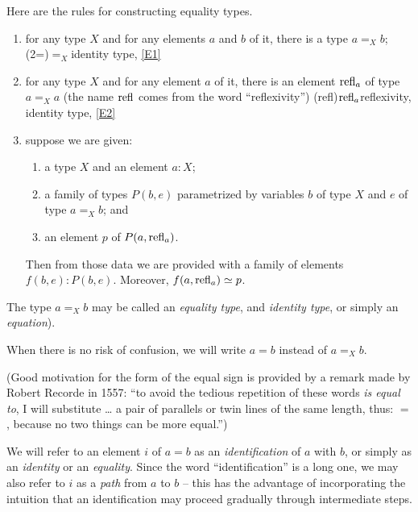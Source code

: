 Here are the rules for constructing equality types.
\begin{enumerate}[label=(E\arabic*),ref=(E\arabic*)]\label{rules-for-equality}
\item\label{E1}
  for any type $X$ and for any elements $a$ and $b$ of it, there is a type $a =_X b$;%
  \glossary(2=){${=_X}$}{identity type, \cref{E1}}%
\item\label{E2} for any type $X$ and for any element $a$ of it, there is an element $\mathrm{refl}_{a}$ of type $a =_X a$
  (the name $\mathrm{refl}_{}$ comes from the word ``reflexivity'')%
  \glossary(refl){$\protect\mathrm{refl}_{a}$}{reflexivity, identity type, \cref{E2}}
\item\label{E3} suppose we are given:
  \begin{enumerate}
  \item a type $X$ and an element $a:X$;
  \item a family of types $P(b,e)$ parametrized by variables $b$ of type $X$ and $e$ of type $a =_X b$; and
  \item an element $p$ of $P(a,\mathrm{refl}_{a})$.
  \end{enumerate}
  Then from those data we are provided with a family of elements $f(b,e) : P(b,e)$.
  Moreover, $f(a,\refl a) \jdeq p$.
\end{enumerate}

The type $a =_X b$ may be called an \emph{equality type}, and \emph{identity type}, or simply an \emph{equation}).

When there is no risk of confusion, we will write $a=b$ instead of $a =_X b$.

(Good motivation for the form of the equal sign is provided by a remark made by Robert Recorde in 1557:
``to avoid the tedious repetition of these words \emph{is equal to}, I will substitute \dots
a pair of parallels or twin lines of the same length, thus: $=$, because no two things can be more equal.'')

We will refer to an element $i$ of $a=b$ as an \emph{identification} of $a$ with $b$, or simply as an
\emph{identity} or an \emph{equality}.  Since the word ``identification'' is a long one, we may also refer to $i$ as a \emph{path} from $a$ to
$b$ -- this has the advantage of incorporating the intuition that an identification may proceed gradually through intermediate steps.%
%

